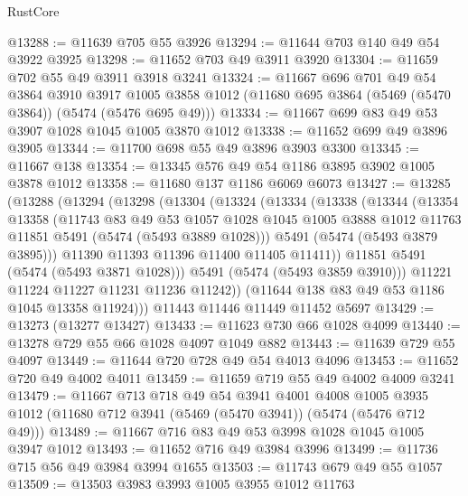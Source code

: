 \begin{lexlean}{RustCore}
\begin{coremodule}
@13288 := @11639 @705 @55 @3926
@13294 := @11644 @703 @140 @49 @54 @3922 @3925
@13298 := @11652 @703 @49 @3911 @3920
@13304 := @11659 @702 @55 @49 @3911 @3918 @3241
@13324 := @11667
    @696
    @701
    @49
    @54
    @3864
    @3910
    @3917
    @1005
    @3858
    @1012
    (@11680 @695 @3864 (@5469 (@5470 @3864)) (@5474 (@5476 @695 @49)))
@13334 := @11667 @699 @83 @49 @53 @3907 @1028 @1045 @1005 @3870 @1012
@13338 := @11652 @699 @49 @3896 @3905
@13344 := @11700 @698 @55 @49 @3896 @3903 @3300
@13345 := @11667 @138
@13354 := @13345 @576 @49 @54 @1186 @3895 @3902 @1005 @3878 @1012
@13358 := @11680 @137 @1186 @6069 @6073
@13427 := @13285
    (@13288
      (@13294
        (@13298
          (@13304
            (@13324
              (@13334
                (@13338
                  (@13344
                    (@13354
                      @13358
                      (@11743
                        @83
                        @49
                        @53
                        @1057
                        @1028
                        @1045
                        @1005
                        @3888
                        @1012
                        @11763
                        @11851
                        @5491
                        (@5474 (@5493 @3889 @1028)))
                      @5491
                      (@5474 (@5493 @3879 @3895)))
                    @11390
                    @11393
                    @11396
                    @11400
                    @11405
                    @11411))
                @11851
                @5491
                (@5474 (@5493 @3871 @1028)))
              @5491
              (@5474 (@5493 @3859 @3910)))
            @11221
            @11224
            @11227
            @11231
            @11236
            @11242))
        (@11644 @138 @83 @49 @53 @1186 @1045 @13358 @11924)))
    @11443
    @11446
    @11449
    @11452
    @5697
@13429 := @13273 (@13277 @13427)
@13433 := @11623 @730 @66 @1028 @4099
@13440 := @13278 @729 @55 @66 @1028 @4097 @1049 @882
@13443 := @11639 @729 @55 @4097
@13449 := @11644 @720 @728 @49 @54 @4013 @4096
@13453 := @11652 @720 @49 @4002 @4011
@13459 := @11659 @719 @55 @49 @4002 @4009 @3241
@13479 := @11667
    @713
    @718
    @49
    @54
    @3941
    @4001
    @4008
    @1005
    @3935
    @1012
    (@11680 @712 @3941 (@5469 (@5470 @3941)) (@5474 (@5476 @712 @49)))
@13489 := @11667 @716 @83 @49 @53 @3998 @1028 @1045 @1005 @3947 @1012
@13493 := @11652 @716 @49 @3984 @3996
@13499 := @11736 @715 @56 @49 @3984 @3994 @1655
@13503 := @11743 @679 @49 @55 @1057
@13509 := @13503 @3983 @3993 @1005 @3955 @1012 @11763

\end{coremodule}
\end{lexlean}
